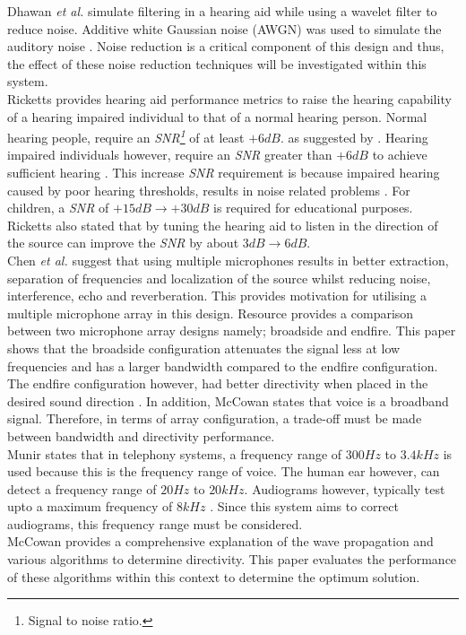 \documentclass[12pt, onecolumn]{article}
\begin{document}
\newline 
\noindent Dhawan \textit{et al.} simulate filtering in a hearing aid while using a wavelet filter to reduce noise. Additive white Gaussian noise (AWGN) was used to simulate the auditory noise \cite{dhawan}. Noise reduction is a critical component of this design and thus, the effect of these noise reduction techniques will be investigated within this system. \\
\newline
\noindent Ricketts \cite{ricketts} provides hearing aid performance metrics to raise the hearing capability of a hearing impaired individual to that of a normal hearing person. Normal hearing people, require an \textit{SNR\footnote{Signal to noise ratio.}} of at least $+6dB.$ as suggested by \cite{moore}. Hearing impaired individuals however, require an \textit{SNR} greater than $+6dB$ to achieve sufficient hearing \cite{tillman}. This increase \textit{SNR} requirement is because impaired hearing caused by poor hearing thresholds, results in noise related problems \cite{ricketts}. For children, a \textit{SNR} of $+15dB \rightarrow +30dB$ is required for educational purposes. Ricketts also stated that by tuning the hearing aid to listen in the direction of the source can improve the \textit{SNR} by about $3dB \rightarrow 6dB$.\\
\newline
\noindent Chen \textit{et al.} \cite{present} suggest that using multiple microphones results in better extraction, separation of frequencies and localization of the source whilst reducing noise, interference, echo and reverberation. This provides motivation for utilising a multiple microphone array in this design. Resource \cite{broadEnd} provides a comparison between two microphone array designs namely; broadside and endfire. This paper shows that the broadside configuration attenuates the signal less at low frequencies and has a larger bandwidth compared to the endfire configuration. The endfire configuration however, had better directivity when placed in the desired sound direction \cite{broadEnd}. In addition, McCowan \cite{mccowan} states that voice is a broadband signal. Therefore, in terms of array configuration, a trade-off must be made between bandwidth and directivity performance.  \\
\newline
\noindent Munir \cite{munir} states that in telephony systems, a frequency range of $300Hz$ to $3.4kHz$ is used because this is the frequency range of voice. The human ear however, can detect a frequency range of $20Hz$ to $20kHz$. Audiograms however, typically test upto a maximum frequency of $8kHz$ \cite{audioMaxFreq}. Since this system aims to correct audiograms, this frequency range must be considered.\\
\newline
\noindent McCowan \cite{mccowan} provides a comprehensive explanation of the wave propagation and various algorithms to determine directivity. This paper evaluates the performance of these algorithms within this context to determine the optimum solution.
\end{document}
